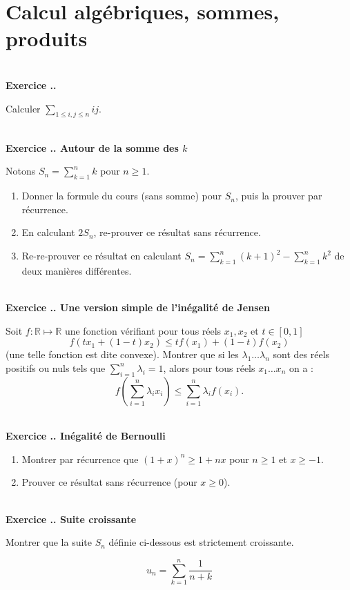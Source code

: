 \documentclass{article}
\newcommand{\mb}[1]{\mathbb{#1}}
\newcounter{exo}
\newcommand{\exercice}[1][\null]{\textbf{\\ \large Exercice \thesection.\theexo. \normalsize #1} \addtocounter{exo}{1}}
\begin{document}
\section{Calcul algébriques, sommes, produits}


\exercice  Calculer $\displaystyle \sum_{1 \le i, j \le n} ij$.


\exercice[Autour de la somme des $k$]

Notons $S_n = \sum_{k=1}^n k $ pour $n \ge 1$.

\begin{enumerate}

\item Donner la formule du cours (sans somme) pour $S_n$, puis la prouver par récurrence.

\item En calculant $2 S_n$, re-prouver ce résultat sans récurrence.

\item Re-re-prouver ce résultat en calculant $S_n = \sum_{k=1}^n (k+1)^2 -  \sum_{k=1}^n k^2  $ de deux manières différentes.
\end{enumerate}




\exercice[Une version simple de l'inégalité de Jensen]

Soit $f: \mb{R} \mapsto \mb{R}$ une fonction vérifiant pour tous réels $x_1, x_2$ et $t \in [0,1]$
$$f(t x_1 +(1-t) x_2) \le t f(x_1) +(1-t) f(x_2)$$  (une telle fonction est dite convexe).
Montrer que si les $\lambda_1 \dots \lambda_n$ sont des réels positifs ou nuls tels que $\sum_{i=1}^n \lambda_i = 1$, alors pour tous réels $x_1 \dots x_n$ on a :
$$f\left(\sum_{i=1}^n \lambda_i x_i\right) \le \sum_{i=1}^n \lambda_i f(x_i).$$

\exercice[Inégalité de Bernoulli]

\begin{enumerate}

\item Montrer par récurrence que $(1+x)^n \ge 1+nx$ pour $n \ge 1$ et $x \ge -1$.

\item Prouver ce résultat sans récurrence (pour $x \ge 0$).

\end{enumerate}

\exercice[Suite croissante]

Montrer que la suite $S_n$ définie ci-dessous est strictement croissante.

\begin{equation*}
    u_n = \sum_{k = 1}^n \frac{1}{n + k}
\end{equation*}
\end{document}
